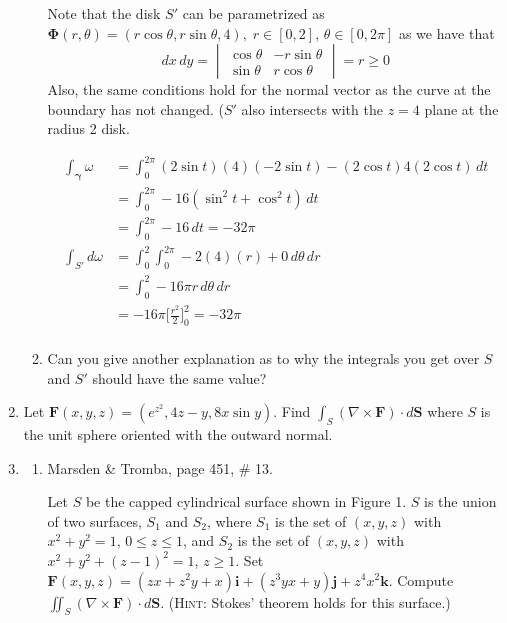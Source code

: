 \documentclass{article}
\begin{document}
\begin{enumerate}
\begin{enumerate}
            Note that the disk $S'$ can be parametrized as $\boldsymbol \Phi
            (r, \theta) = (r \cos \theta, r \sin \theta, 4),\; r \in [0,2],\,
            \theta \in [0,2\pi]$ as we have that
            \[ dx\, dy = \begin{vmatrix} \cos \theta & -r\sin \theta \\ 
            \sin \theta & r \cos \theta \end{vmatrix} = r \geq 0 \] 
            Also, the same conditions hold for the normal vector as the curve
            at the boundary has not changed. ($S'$ also intersects with the 
            $z=4$ plane at the radius 2 disk.

            \begin{align*}
                \int_{\boldsymbol \gamma} \omega &= \int_0^{2\pi} 
                (2\sin t)(4)(-2\sin t) - (2\cos t)4(2\cos t) \, dt \\
                &= \int_0^{2\pi}  -16(\sin ^2 t + \cos ^2 t) \, dt \\
                &= \int_0^{2\pi} -16 \, dt  = -32 \pi\\
                \int_{S'} d \omega &= \int_0^2 \int_0^{2\pi} -2(4)(r) + 0 \,
                d\theta \, dr \\
                &= \int_0^2 -16 \pi r \, d\theta \, dr \\
                &= -16 \pi \bigg[ \frac{r^2}{2} \bigg]_0^2 = -32 \pi \\
            \end{align*} 

        \item Can you give another explanation as to why the integrals you 
        get over $S$ and $S'$ should have the same value?

    \end{enumerate}
    
    \newpage
    \item Let $\boldsymbol F (x,y,z) = (e^{z^2}, 4z-y, 8x \sin y)$. 
    Find $\displaystyle \int_S (\nabla \times \boldsymbol F)\cdot d\boldsymbol 
    S$ where $S$ is the unit sphere oriented with the outward normal.

    \newpage
    \item 
    \begin{enumerate}
        \item Marsden \& Tromba, page 451, \# 13.

            Let $S$ be the capped cylindrical surface shown in Figure 1. 
            $S$ is the union of two surfaces, $S_1$ and $S_2$, where $S_1$ 
            is the set of $(x,y,z)$ with $x^2 + y^2 = 1$, $0 \leq z \leq 1$, 
            and $S_2$ is the set of $(x,y,z)$ with $x^2 + y^2 + (z-1)^2 = 1$,
            $z \geq 1$. Set $\boldsymbol F (x,y,z) = (zx + z^2y + x) 
            \boldsymbol i + (z^3yx + y)\boldsymbol j + z^4x^2\boldsymbol k$.
            Compute $\displaystyle \iint_S (\nabla \times \boldsymbol F) \cdot
            d \boldsymbol S$. (\textsc{Hint}: Stokes' theorem holds for this
            surface.)



\end{enumerate}
\end{enumerate}
\end{document}
